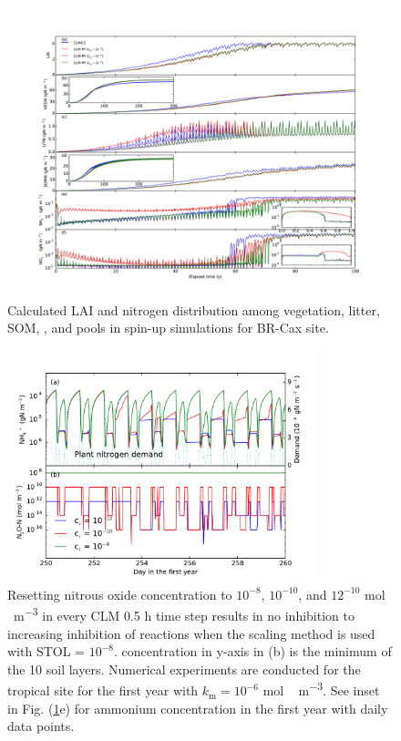 \documentclass[gmd, manuscript]{copernicus}
\begin{document}
\begin{figure}[t]
\includegraphics[width=18cm]{../figs/fig12/cax300yl.pdf}
\caption{Calculated LAI and nitrogen distribution among vegetation, litter,
SOM, , and  pools in spin-up simulations for BR-Cax
site. }
\label{fig:cax300yl}
\end{figure}


\begin{figure}[t]
\includegraphics[width=0.8\textwidth]{../figs/fig18/cax1yn2o.pdf}
\caption{Resetting nitrous oxide concentration to $10^{-8}$, $10^{-10}$, and
$12^{-10}$ \unit{mol\,m^{-3}} in every CLM 0.5 h time step results in no
inhibition to increasing inhibition of reactions when the scaling method is
used with STOL = $10^{-8}$.  concentration in y-axis in (b) is the
minimum of the 10 soil layers. Numerical experiments are conducted for the
tropical site for the first year with $k_\text{m}=10^{-6}$ \unit{mol\,m^{-3}}.
See inset in Fig. (\ref{fig:cax300yl}e) for ammonium concentration in the first
year with daily data points.}
\label{fig:cax1yn2o}
\end{figure}
\end{document}
